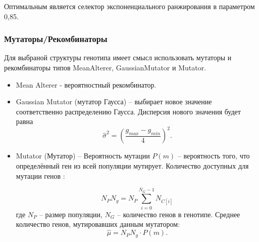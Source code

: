 			Оптимальным является селектор экспоненциального ранжирования в параметром 0,85.
		
		\subsubsection{Мутаторы/Рекомбинаторы}
			Для выбраной структуры генотипа имеет смысл использовать мутаторы и рекомбинаторы типов MeanAlterer, GaussianMutator и Mutator.
			
			\begin{itemize}
				\item Mean Alterer - вероятностный рекомбинатор.
				\item Gaussian Mutator (мутатор Гаусса) -- выбирает новое значение соответственно распределению Гаусса. Дисперсия нового значения будет равна
				\[\hat{\sigma }^2 = \left ( \frac{ g_{max} - g_{min} }{4}\right )^2.\]
				\item Mutator (Мутатор) --  Вероятность мутации $ P(m) $ -- вероятность того, что определённый ген из всей популяции мутирует. Количество доступных для мутации генов :
				
				\[N_P N_{g}=N_P \sum_{i=0}^{N_{G}-1}N_{C[i]}\]
				где $ N_P $ -- размер популяции, $ N_G $ --  количество генов в генотипе. Среднее количество генов, мутировавших данным мутатором:
				\[\hat{\mu}=N_{P}N_{g}\cdot P(m).\]
			\end{itemize}
			
